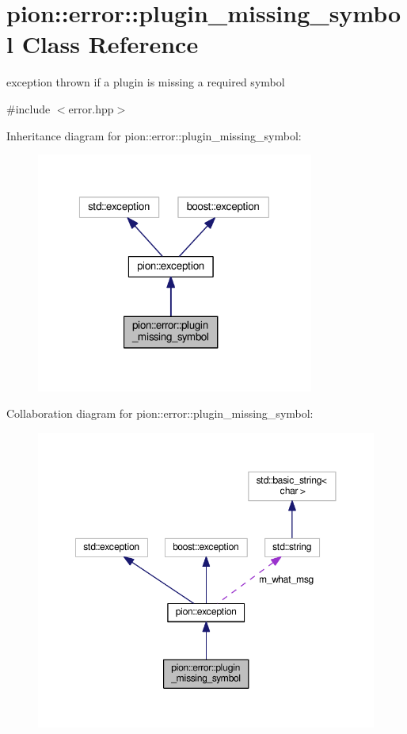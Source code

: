 \hypertarget{classpion_1_1error_1_1plugin__missing__symbol}{\section{pion\-:\-:error\-:\-:plugin\-\_\-missing\-\_\-symbol Class Reference}
\label{classpion_1_1error_1_1plugin__missing__symbol}
}


exception thrown if a plugin is missing a required symbol  




{\ttfamily \#include $<$error.\-hpp$>$}



Inheritance diagram for pion\-:\-:error\-:\-:plugin\-\_\-missing\-\_\-symbol\-:
\nopagebreak
\begin{figure}[H]
\begin{center}
\leavevmode
\includegraphics[width=259pt]{classpion_1_1error_1_1plugin__missing__symbol__inherit__graph}
\end{center}
\end{figure}


Collaboration diagram for pion\-:\-:error\-:\-:plugin\-\_\-missing\-\_\-symbol\-:
\nopagebreak
\begin{figure}[H]
\begin{center}
\leavevmode
\includegraphics[width=350pt]{classpion_1_1error_1_1plugin__missing__symbol__coll__graph}
\end{center}
\end{figure}
